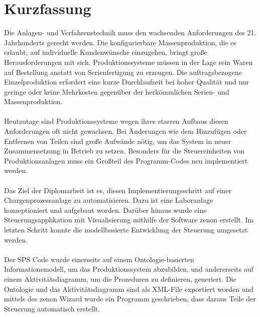 \chapter*{Kurzfassung}

Die Anlagen- und Verfahrenstechnik muss den wachsenden Anforderungen des 21. Jahrhunderts gerecht werden. Die konfigurierbare Massenproduktion, die es erlaubt, auf individuelle Kundenwünsche einzugehen, bringt große Herausforderungen mit sich. Produktionssysteme müssen in der Lage sein Waren auf Bestellung anstatt von Serienfertigung zu erzeugen. Die auftragsbezogene Einzelproduktion erfordert eine kurze Durchlaufzeit bei hoher Qualität und nur geringe oder keine Mehrkosten gegenüber der herkömmlichen Serien- und Massenproduktion. \\\\
Heutzutage sind Produktionssysteme wegen ihres starren Aufbaus diesen Anforderungen oft nicht gewachsen. Bei Änderungen wie dem Hinzufügen oder Entfernen von Teilen sind große Aufwände nötig, um das System in neuer Zusammensetzung in Betrieb zu setzen. Besonders für die Steuereinheiten von Produktionsanlagen muss ein Großteil des Programm-Codes neu implementiert werden.\\\\
Das Ziel der Diplomarbeit ist es, diesen Implementierungsschritt auf einer Chargenprozessanlage zu automatisieren. Dazu ist eine Laboranlage konzeptioniert und aufgebaut worden. Darüber hinaus wurde eine Steuerungsapplikation mit Visualisierung mithilfe der Software zenon erstellt. Im letzten Schritt konnte die modellbasierte Entwicklung der Steuerung umgesetzt werden. 
\\\\
Der \ac{SPS} Code wurde einerseits auf einem Ontologie-basierten Informationsmodell, um das Produktionssystem abzubilden, und andererseits auf einem Aktivitätsdiagramm, um die Prozeduren zu definieren, generiert. Die Ontologie und das Aktivitätsdiagramm sind als \ac{XML}-File exportiert worden und mittels des zenon Wizard wurde ein Programm geschrieben, dass daraus Teile der Steuerung automatisch erstellt.
